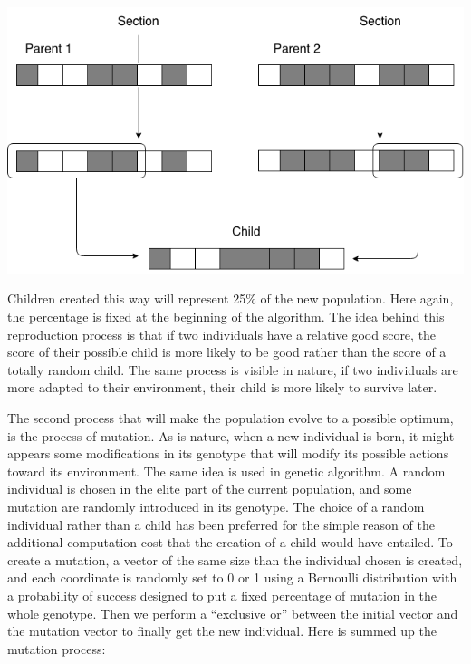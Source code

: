 \documentclass{report}
\begin{document}
	\vspace{1cm}
	\begin{center}
		\includegraphics[scale=0.45]{ressources/ag1}
	\end{center}
	
	\vspace{1cm}
	Children created this way will represent 25\% of the new population. Here again, the percentage is fixed at the beginning of the algorithm. The idea behind this reproduction process is that if two individuals have a relative good score, the score of their possible child is more likely to be good rather than the score of a totally random child. The same process is visible in nature, if two individuals are more adapted to their environment, their child is more likely to survive later.
	
	The second process that will make the population evolve to a possible optimum, is the process of mutation. As is nature, when a new individual is born, it might appears some modifications in its genotype that will modify its possible actions toward its environment. The same idea is used in genetic algorithm. A random individual is chosen in the elite part of the current population, and some mutation are randomly introduced in its genotype. The choice of a random individual rather than a child has been preferred for the simple reason of the additional computation cost that the creation of a child would have entailed. To create a mutation, a vector of the same size than the individual chosen is created, and each coordinate is randomly set to 0 or 1 using a Bernoulli distribution with a probability of success designed to put a fixed percentage of mutation in the whole genotype. Then we perform a “exclusive or” between the initial vector and the mutation vector to finally get the new individual. Here is summed up the mutation process:
	
\end{document}
